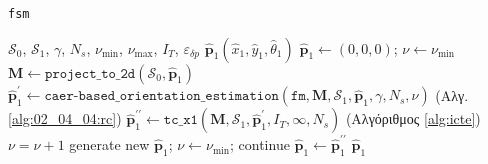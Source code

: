 \begin{algorithm}
  \caption{\texttt{fsm}}
  \begin{spacing}{1.2}
  \begin{algorithmic}[1]
    \REQUIRE $\mathcal{S}_0$, $\mathcal{S}_1$, $\gamma$, $N_s$, $\nu_{\min}$, $\nu_{\max}$, $I_T$, $\varepsilon_{\delta p}$
    \ENSURE $\hat{\bm{p}}_1(\hat{x}_1, \hat{y}_1, \hat{\theta}_1)$
    \STATE $\hat{\bm{p}}_1 \leftarrow (0,0,0)$; $\nu \leftarrow \nu_{\min}$
    \STATE $\bm{M} \leftarrow \texttt{project\_to\_2d}(\mathcal{S}_0, \hat{\bm{p}}_1)$
    \WHILE {$\nu \leq \nu_{\max}$}
      \STATE $\hat{\bm{p}}_1^\prime \leftarrow \texttt{caer-based\_orientation\_estimation}(\texttt{fm}, \bm{M}, \mathcal{S}_1, \hat{\bm{p}}_1, \gamma, N_s, \nu)$ \hfill (Αλγ. \ref{alg:02_04_04:rc})
      \STATE $\hat{\bm{p}}_1^{\prime\prime} \leftarrow \texttt{tc\_x1}(\bm{M}, \mathcal{S}_1, \hat{\bm{p}}_1^\prime, I_T, \infty, N_s)$  \hfill (Αλγόριθμος \ref{alg:icte})
        \STATE $\nu = \nu + 1$
      \ENDIF
        \STATE generate new $\hat{\bm{p}}_1$; $\nu \leftarrow \nu_{\min}$; continue
      \ENDIF
      \STATE $\hat{\bm{p}}_1 \leftarrow \hat{\bm{p}}_1^{\prime\prime}$
    \ENDWHILE
    \RETURN $\hat{\bm{p}}_1$
  \end{algorithmic}
  \end{spacing}
  \label{alg:algorithm_fsm}
\end{algorithm}
